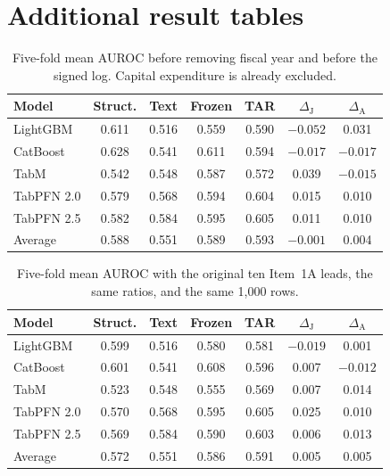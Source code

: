 \documentclass{article}
\begin{document}



\clearpage
\appendix
\section{Additional result tables}
\label{app:tables}

\begin{table}[H]
\centering
\caption{Five-fold mean AUROC before removing fiscal year and before the signed log. Capital expenditure is already excluded.}
\label{tab:capex}
\small
\setlength{\tabcolsep}{4pt}
\begin{tabular}{lcccccc}
\toprule
Model & Struct. & Text & Frozen & TAR & $\Delta_{\mathrm{J}}$ & $\Delta_{\mathrm{A}}$ \\
\midrule
LightGBM & 0.611 & 0.516 & 0.559 & 0.590 & $-0.052$ & 0.031 \\
CatBoost & 0.628 & 0.541 & 0.611 & 0.594 & $-0.017$ & $-0.017$ \\
TabM & 0.542 & 0.548 & 0.587 & 0.572 & 0.039 & $-0.015$ \\
TabPFN 2.0 & 0.579 & 0.568 & 0.594 & 0.604 & 0.015 & 0.010 \\
TabPFN 2.5 & 0.582 & 0.584 & 0.595 & 0.605 & 0.011 & 0.010 \\
\midrule
Average & 0.588 & 0.551 & 0.589 & 0.593 & $-0.001$ & 0.004 \\
\bottomrule
\end{tabular}
\end{table}

\begin{table}[H]
\centering
\caption{Five-fold mean AUROC with the original ten Item~1A leads, the same ratios, and the same 1{,}000 rows.}
\label{tab:leads}
\small
\setlength{\tabcolsep}{4pt}
\begin{tabular}{lcccccc}
\toprule
Model & Struct. & Text & Frozen & TAR & $\Delta_{\mathrm{J}}$ & $\Delta_{\mathrm{A}}$ \\
\midrule
LightGBM & 0.599 & 0.516 & 0.580 & 0.581 & $-0.019$ & 0.001 \\
CatBoost & 0.601 & 0.541 & 0.608 & 0.596 & 0.007 & $-0.012$ \\
TabM & 0.523 & 0.548 & 0.555 & 0.569 & 0.007 & 0.014 \\
TabPFN 2.0 & 0.570 & 0.568 & 0.595 & 0.605 & 0.025 & 0.010 \\
TabPFN 2.5 & 0.569 & 0.584 & 0.590 & 0.603 & 0.006 & 0.013 \\
\midrule
Average & 0.572 & 0.551 & 0.586 & 0.591 & 0.005 & 0.005 \\
\bottomrule
\end{tabular}
\end{table}
\end{document}
